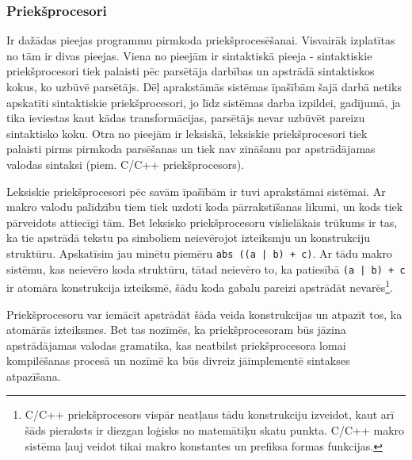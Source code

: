 
\subsubsection{\label{sbsbs:sys_texttransform}Priekšprocesori}

Ir dažādas pieejas programmu pirmkoda priekšprocesēšanai. Visvairāk izplatītas no tām ir divas pieejas. Viena no pieejām ir sintaktiskā pieeja - sintaktiskie priekšprocesori tiek palaisti pēc parsētāja darbības un apstrādā sintaktiskos kokus, ko uzbūvē parsētājs. Dēļ aprakstāmās sistēmas īpašībām šajā darbā netiks apskatīti sintaktiskie priekšprocesori, jo līdz sistēmas darba izpildei, gadījumā, ja tika ieviestas kaut kādas transformācijas, parsētājs nevar uzbūvēt pareizu sintaktisko koku. Otra no pieejām ir leksiskā, leksiskie priekšprocesori tiek palaisti pirms pirmkoda parsēšanas un tiek nav zināšanu par apstrādājamas valodas sintaksi (piem. C/C++ priekšprocesors). 

Leksiskie priekšprocesori pēc savām īpašībām ir tuvi aprakstāmai sistēmai. Ar makro valodu palīdzību tiem tiek uzdoti koda pārrakstīšanas likumi, un kods tiek pārveidots attiecīgi tām. Bet leksisko priekšprocesoru vislielākais trūkums ir tas, ka tie apstrādā tekstu pa simboliem neievērojot izteiksmju un konstrukciju struktūru. Apskatīsim jau minētu piemēru \verb/abs ((a | b) + c)/. Ar tādu makro sistēmu, kas neievēro koda struktūru, tātad neievēro to, ka patiesībā \verb/(a | b) + c/ ir atomāra konstrukcija izteiksmē, šādu koda gabalu pareizi apstrādāt nevarēs\footnote{C/C++ priekšprocesors vispār neatļaus tādu konstrukciju izveidot, kaut arī šāds pieraksts ir diezgan loģisks no matemātiķu skatu punkta. C/C++ makro sistēma ļauj veidot tikai makro konstantes un prefiksa formas funkcijas.}.

Priekšprocesoru var iemācīt apstrādāt šāda veida konstrukcijas un atpazīt tos, ka atomārās izteiksmes. Bet tas nozīmēs, ka priekšprocesoram būs jāzina apstrādājamas valodas gramatika, kas neatbilst priekšprocesora lomai kompilēšanas procesā un nozīmē ka būs divreiz jāimplementē sintakses atpazīšana.

